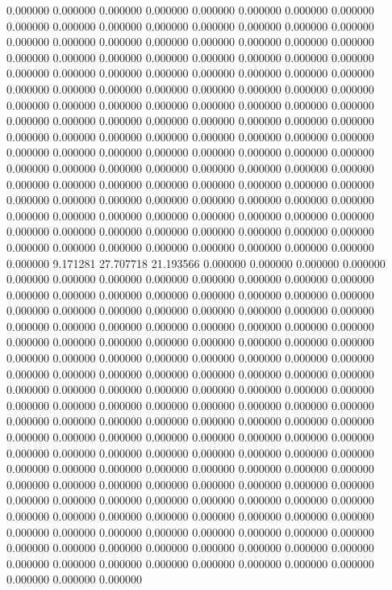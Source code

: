 0.000000 0.000000 0.000000
0.000000 0.000000 0.000000
0.000000 0.000000 0.000000
0.000000 0.000000 0.000000
0.000000 0.000000 0.000000
0.000000 0.000000 0.000000
0.000000 0.000000 0.000000
0.000000 0.000000 0.000000
0.000000 0.000000 0.000000
0.000000 0.000000 0.000000
0.000000 0.000000 0.000000
0.000000 0.000000 0.000000
0.000000 0.000000 0.000000
0.000000 0.000000 0.000000
0.000000 0.000000 0.000000
0.000000 0.000000 0.000000
0.000000 0.000000 0.000000
0.000000 0.000000 0.000000
0.000000 0.000000 0.000000
0.000000 0.000000 0.000000
0.000000 0.000000 0.000000
0.000000 0.000000 0.000000
0.000000 0.000000 0.000000
0.000000 0.000000 0.000000
0.000000 0.000000 0.000000
0.000000 0.000000 0.000000
0.000000 0.000000 0.000000
0.000000 0.000000 0.000000
0.000000 0.000000 0.000000
0.000000 0.000000 0.000000
0.000000 0.000000 0.000000
0.000000 0.000000 0.000000
0.000000 0.000000 0.000000
0.000000 0.000000 0.000000
0.000000 0.000000 0.000000
0.000000 0.000000 0.000000
0.000000 0.000000 0.000000
0.000000 0.000000 0.000000
0.000000 0.000000 0.000000
0.000000 0.000000 0.000000
0.000000 0.000000 0.000000
0.000000 0.000000 0.000000
0.000000 0.000000 0.000000
9.171281 27.707718 21.193566
0.000000 0.000000 0.000000
0.000000 0.000000 0.000000
0.000000 0.000000 0.000000
0.000000 0.000000 0.000000
0.000000 0.000000 0.000000
0.000000 0.000000 0.000000
0.000000 0.000000 0.000000
0.000000 0.000000 0.000000
0.000000 0.000000 0.000000
0.000000 0.000000 0.000000
0.000000 0.000000 0.000000
0.000000 0.000000 0.000000
0.000000 0.000000 0.000000
0.000000 0.000000 0.000000
0.000000 0.000000 0.000000
0.000000 0.000000 0.000000
0.000000 0.000000 0.000000
0.000000 0.000000 0.000000
0.000000 0.000000 0.000000
0.000000 0.000000 0.000000
0.000000 0.000000 0.000000
0.000000 0.000000 0.000000
0.000000 0.000000 0.000000
0.000000 0.000000 0.000000
0.000000 0.000000 0.000000
0.000000 0.000000 0.000000
0.000000 0.000000 0.000000
0.000000 0.000000 0.000000
0.000000 0.000000 0.000000
0.000000 0.000000 0.000000
0.000000 0.000000 0.000000
0.000000 0.000000 0.000000
0.000000 0.000000 0.000000
0.000000 0.000000 0.000000
0.000000 0.000000 0.000000
0.000000 0.000000 0.000000
0.000000 0.000000 0.000000
0.000000 0.000000 0.000000
0.000000 0.000000 0.000000
0.000000 0.000000 0.000000
0.000000 0.000000 0.000000
0.000000 0.000000 0.000000
0.000000 0.000000 0.000000
0.000000 0.000000 0.000000
0.000000 0.000000 0.000000
0.000000 0.000000 0.000000
0.000000 0.000000 0.000000
0.000000 0.000000 0.000000
0.000000 0.000000 0.000000
0.000000 0.000000 0.000000
0.000000 0.000000 0.000000
0.000000 0.000000 0.000000
0.000000 0.000000 0.000000
